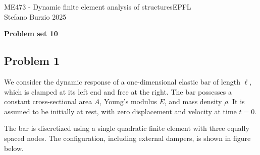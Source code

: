 \documentclass[12pt]{article}
\begin{document}
\noindent ME473 - Dynamic finite element analysis of structures\hfill EPFL\\
Stefano Burzio \hfill 2025\\
\vspace{0.3cm}

\hspace*{\fill}\textbf{\Large Problem set 10}\hspace*{\fill}

\hrulefill

\subsection*{Problem 1}
We consider the dynamic response of a one-dimensional elastic bar of length \( \ell \), which is clamped at its left end and free at the right. The bar possesses a constant cross-sectional area \( A \), Young’s modulus \( E \), and mass density \( \rho \). It is assumed to be initially at rest, with zero displacement and velocity at time \( t = 0 \).

The bar is discretized using a single quadratic finite element with three equally spaced nodes. The configuration, including external dampers, is shown in figure below.
\begin{figure}[h!]
  \centering
  \label{fig:bar}
\end{figure}
\end{document}
